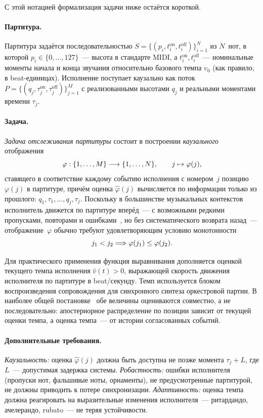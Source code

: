 С этой нотацией формализация задачи ниже остаётся короткой.

\paragraph*{Партитура.} Партитура задаётся последовательностью
$S = \{(p_i, t_i^{\text{on}}, t_i^{\text{off}})\}_{i=1}^{N}$ из
$N$~нот, в которой $p_i \in \{0, \dots, 127\}$~--- высота в
стандарте MIDI, а $t_i^{\text{on}}, t_i^{\text{off}}$~---
номинальные моменты начала и конца звучания относительно
базового темпа $v_0$ (как правило, в beat-единицах). Исполнение
поступает каузально как поток
$P = \{(q_j, \tau_j^{\text{on}}, \tau_j^{\text{off}})\}_{j=1}^{M}$
с реализованными высотами $q_j$ и реальными моментами времени
$\tau_j$.

\paragraph*{Задача.} \textit{Задача отслеживания партитуры}
состоит в построении \textit{каузального} отображения
\begin{equation}
\varphi : \{1, \dots, M\} \longrightarrow \{1, \dots, N\},
\qquad j \mapsto \varphi(j),
\eqlab{alignment-formal}
\end{equation}
ставящего в соответствие каждому событию исполнения с номером~$j$
позицию $\varphi(j)$ в партитуре, причём оценка $\hat\varphi(j)$
вычисляется по информации только из прошлого: $q_1, \tau_1,
\dots, q_j, \tau_j$. Поскольку в большинстве музыкальных
контекстов исполнитель движется по партитуре вперёд~--- с
возможными редкими пропусками, повторами и
ошибками~\cite{Nakamura2015}, но без систематического возврата
назад~--- отображение~$\varphi$ обычно требуют удовлетворяющим
условию монотонности
\begin{equation}
j_1 < j_2 \Longrightarrow \varphi(j_1) \le \varphi(j_2).
\eqlab{monotonicity-formal}
\end{equation}

Для практического применения функция выравнивания дополняется
оценкой текущего темпа исполнения $\hat v(t) > 0$, выражающей
скорость движения исполнителя по партитуре в beat/секунду.
Темп используется блоком воспроизведения сопровождения для
синхронного синтеза оркестровой партии. В наиболее общей
постановке~\cite{Cont2010,Raphael2010} обе величины оцениваются
совместно, а не последовательно: апостериорное распределение по
позиции зависит от текущей оценки темпа, а оценка темпа~--- от
истории согласованных событий.

\paragraph*{Дополнительные требования.}
\textit{Каузальность:} оценка $\hat\varphi(j)$ должна быть
доступна не позже момента $\tau_j + L$, где $L$~--- допустимая
задержка системы.
\textit{Робастность:} ошибки исполнителя (пропуски нот,
фальшивые ноты, орнаменты), не предусмотренные партитурой,
не должны приводить к потере синхронизации.
\textit{Адаптивность:} оценка темпа должна реагировать на
выразительные изменения исполнителя~--- ритардандо, ачелерандо,
rubato~--- не теряя устойчивости.
